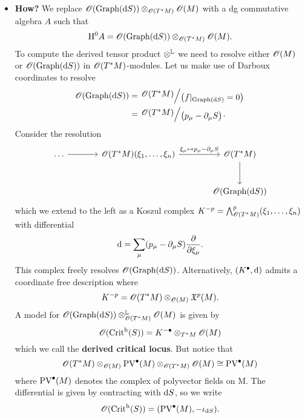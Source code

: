 \begin{example}
\begin{itemize}
    \item \textbf{How?} We replace $\mathscr{O} (\operatorname{Graph}(\mathrm{d} S)) \otimes_{\mathscr{O} (T^*M)} \mathscr{O}(M)$ with a dg commutative algebra $A$ such that
    \begin{equation*}
      \mathrm{H}^0 A = \mathscr{O} (\operatorname{Graph}(\mathrm{d} S)) \otimes_{\mathscr{O} (T^*M)} \mathscr{O}(M).
    \end{equation*}
    To compute the derived tensor product $\otimes^{\mathbb{L}}$ we need to resolve either $\mathscr{O}(M)$ or $\mathscr{O}(\operatorname{Graph}(\mathrm{d} S))$ in $\mathscr{O}(T^* M)$-modules. Let us make use of Darboux coordinates to resolve
    \begin{align*}
      \Oscr(\Graph(\drm S)) &=
      \bigslant{\Oscr(T^* M)}{ \bigl( f \vert_{\Graph(\drm S)} = 0 \bigr) } \\
                            &= \bigslant{ \Oscr( T^* M )}{ \bigl( p_{\mu} - \partial_\mu S \bigr) }.
    \end{align*}
    Consider the resolution
    \begin{equation*}
      \begin{tikzcd}[sep=large]
        \dots \arrow[r] &
        \Oscr(T^* M) (\xi_1, \dots, \xi_n) \arrow[r, "\xi_{\mu} \mapsto p_{\mu} - \partial_{\mu} S"] &
        \Oscr(T^* M) \arrow[d] \\ &&
        \Oscr(\Graph(\drm S))
      \end{tikzcd}
    \end{equation*}
    which we extend to the left as a Koszul complex
    $K^{-p} = \bigwedge_{\mathscr{O}(T^* M)}^p (\xi_1, \dots, \xi_n)$
    with differential 
    \begin{equation*}
      \mathrm{d} = \sum_{\mu} (p_{\mu} - \partial_{\mu} S) \frac{\partial}{\partial \xi_{\mu}}.
    \end{equation*}
    This complex freely resolves $\mathscr{O}(\operatorname{Graph}(\mathrm{d} S))$. Alternatively, $(K^\bullet, \mathrm{d})$ admits a coordinate free description where
    \begin{equation*}
      K^{-p} = \mathscr{O}(T^* M) \otimes_{\mathscr{O}(M)} \mathfrak{X}^p (M).
    \end{equation*}
    A model for $\mathscr{O}(\operatorname{Graph}(\mathrm{d} S)) \otimes_{\mathscr{O}(T^* M)}^{\mathbb{L}} \mathscr{O}(M)$ is given by
    \begin{equation*}
      \mathscr{O}(\operatorname{Crit}^{\mathrm{h}}(S)) = K^{-\bullet} \otimes_{T^* M} \mathscr{O}(M)
    \end{equation*}
    which we call the \textbf{derived critical locus}. But notice that
    \begin{equation*}
      \mathscr{O}(T^* M) \otimes_{\mathscr{O}(M)} \operatorname{PV}^\bullet(M) \otimes_{\mathscr{O}(T^* M)} \mathscr{O}(M) \cong \operatorname{PV}^\bullet(M)
    \end{equation*}
    where $\operatorname{PV}^\bullet(M)$ denotes the complex of polyvector fields on M. The differential is given by contracting with $\mathrm{d} S$, so we write
    \begin{equation*}
      \mathscr{O}(\operatorname{Crit}^{\mathrm{h}}(S)) = (\operatorname{PV}^\bullet(M), -\iota_{\mathrm{d} S}).
    \end{equation*}
  \end{itemize}
\end{example}
